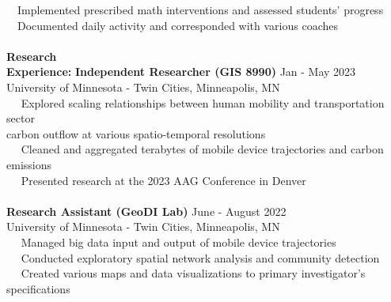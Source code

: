 \documentclass[letterpaper,12pt]{article}
\numberwithin{equation}{section}
\begin{document}
\hspace*{1.2in} \textbullet ~~Implemented prescribed math interventions and assessed students' progress\\
\hspace*{1.2in} \textbullet ~~Documented daily activity and corresponded with various coaches\\
\\
\noindent\textbf{Research}\\
\noindent\textbf{Experience:}\hspace*{.16in}\textbf{ Independent Researcher (GIS 8990)} \hspace*{2.2in} Jan - May 2023\\
\hspace*{1.16in} University of Minnesota - Twin Cities, Minneapolis, MN \vspace*{.1cm}\\
\hspace*{1.2in} \textbullet ~~ Explored scaling relationships between human mobility and transportation sector \\
\hspace*{1.6in} carbon outflow at various spatio-temporal resolutions\\
\hspace*{1.2in} \textbullet ~~ Cleaned and aggregated terabytes of mobile device trajectories and carbon emissions\\
\hspace*{1.2in} \textbullet ~~ Presented research at the 2023 AAG Conference in Denver
\\\\
\hspace*{1.16in} \textbf{Research Assistant (GeoDI Lab)} \hspace*{2.1in} June - August 2022\\
\hspace*{1.16in} University of Minnesota - Twin Cities, Minneapolis, MN \vspace*{.1cm}\\
\hspace*{1.2in} \textbullet ~~ Managed big data input and output of mobile device trajectories\\
\hspace*{1.2in} \textbullet ~~ Conducted exploratory spatial network analysis and community detection\\
\hspace*{1.2in} \textbullet ~~ Created various maps and data visualizations to primary investigator's specifications
\end{document}
